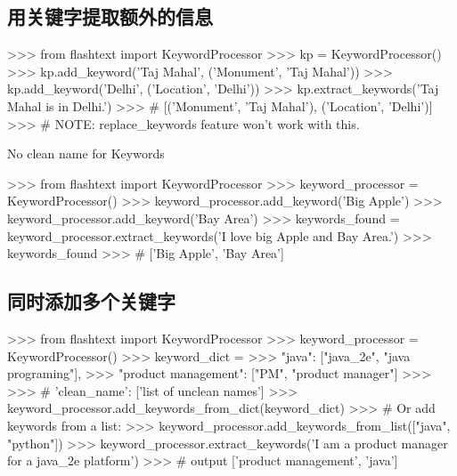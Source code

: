 \documentclass{article}
\begin{document}
\subsection{用关键字提取额外的信息}
\begin{ipythoncode}

>>> from flashtext import KeywordProcessor
>>> kp = KeywordProcessor()
>>> kp.add_keyword('Taj Mahal', ('Monument', 'Taj Mahal'))
>>> kp.add_keyword('Delhi', ('Location', 'Delhi'))
>>> kp.extract_keywords('Taj Mahal is in Delhi.')
>>> # [('Monument', 'Taj Mahal'), ('Location', 'Delhi')]
>>> # NOTE: replace_keywords feature won't work with this.
\end{ipythoncode}

No clean name for Keywords
\begin{ipythoncode}

>>> from flashtext import KeywordProcessor
>>> keyword_processor = KeywordProcessor()
>>> keyword_processor.add_keyword('Big Apple')
>>> keyword_processor.add_keyword('Bay Area')
>>> keywords_found = keyword_processor.extract_keywords('I love big Apple and Bay Area.')
>>> keywords_found
>>> # ['Big Apple', 'Bay Area']
\end{ipythoncode}

\subsection{同时添加多个关键字}
\begin{ipythoncode}

>>> from flashtext import KeywordProcessor
>>> keyword_processor = KeywordProcessor()
>>> keyword_dict = {
>>>     "java": ["java_2e", "java programing"],
>>>     "product management": ["PM", "product manager"]
>>> }
>>> # {'clean_name': ['list of unclean names']}
>>> keyword_processor.add_keywords_from_dict(keyword_dict)
>>> # Or add keywords from a list:
>>> keyword_processor.add_keywords_from_list(["java", "python"])
>>> keyword_processor.extract_keywords('I am a product manager for a java_2e platform')
>>> # output ['product management', 'java']
\end{ipythoncode}
\end{document}
